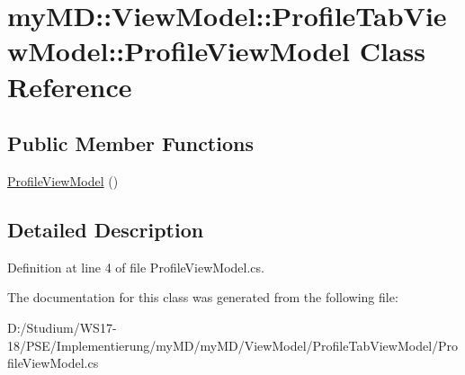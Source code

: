 \hypertarget{classmy_m_d_1_1_view_model_1_1_profile_tab_view_model_1_1_profile_view_model}{
\section{my\-MD::View\-Model::Profile\-Tab\-View\-Model::Profile\-View\-Model Class Reference}
\label{d7/d0a/classmy_m_d_1_1_view_model_1_1_profile_tab_view_model_1_1_profile_view_model}
}
\subsection*{Public Member Functions}
\begin{CompactItemize}
\item 
\hypertarget{classmy_m_d_1_1_view_model_1_1_profile_tab_view_model_1_1_profile_view_model_a3b3d0c159004ac012c54b55010689cc}{
\hyperlink{classmy_m_d_1_1_view_model_1_1_profile_tab_view_model_1_1_profile_view_model_a3b3d0c159004ac012c54b55010689cc}{Profile\-View\-Model} ()}
\label{d7/d0a/classmy_m_d_1_1_view_model_1_1_profile_tab_view_model_1_1_profile_view_model_a3b3d0c159004ac012c54b55010689cc}

\end{CompactItemize}


\subsection{Detailed Description}




Definition at line 4 of file Profile\-View\-Model.cs.

The documentation for this class was generated from the following file:\begin{CompactItemize}
\item 
D:/Studium/WS17-18/PSE/Implementierung/my\-MD/my\-MD/View\-Model/Profile\-Tab\-View\-Model/Profile\-View\-Model.cs\end{CompactItemize}
